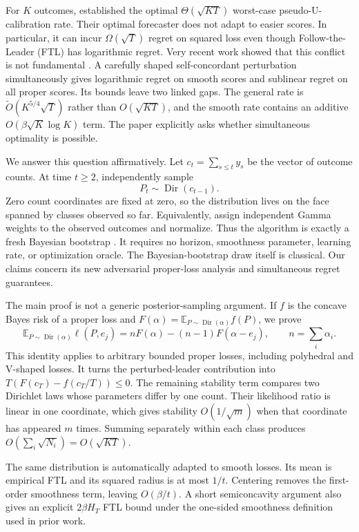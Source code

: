\documentclass{article}
\theoremstyle{definition}
\theoremstyle{remark}
\newcommand{\E}{\mathbb E}
\newcommand{\Dir}{\operatorname{Dir}}
\begin{document}
For $K$ outcomes, \citet{luo2024optimal} established the optimal $\Theta(\sqrt{KT})$ worst-case pseudo-U-calibration rate.  Their optimal forecaster does not adapt to easier scores.  In particular, it can incur $\Omega(\sqrt T)$ regret on squared loss even though Follow-the-Leader (FTL) has logarithmic regret.  Very recent work showed that this conflict is not fundamental \citep{frongillo2026simultaneous}.  A carefully shaped self-concordant perturbation simultaneously gives logarithmic regret on smooth scores and sublinear regret on all proper scores.  Its bounds leave two linked gaps.  The general rate is $\widetilde O(K^{5/4}\sqrt T)$ rather than $O(\sqrt{KT})$, and the smooth rate contains an additive $O(\beta\sqrt K\log K)$ term.  The paper explicitly asks whether simultaneous optimality is possible.

We answer this question affirmatively.  Let $c_t=\sum_{s\leq t}y_s$ be the vector of outcome counts.  At time $t\geq2$, independently sample \[ P_t\sim\Dir(c_{t-1}). \] Zero count coordinates are fixed at zero, so the distribution lives on the face spanned by classes observed so far.  Equivalently, assign independent Gamma weights to the observed outcomes and normalize.  Thus the algorithm is exactly a fresh Bayesian bootstrap \citep{rubin1981bootstrap}.  It requires no horizon, smoothness parameter, learning rate, or optimization oracle. The Bayesian-bootstrap draw itself is classical.  Our claims concern its new adversarial proper-loss analysis and simultaneous regret guarantees.

The main proof is not a generic posterior-sampling argument.  If $f$ is the concave Bayes risk of a proper loss and $F(\alpha)=\E_{P\sim\Dir(\alpha)}f(P)$, we prove
\begin{equation}
 \E_{P\sim\Dir(\alpha)}\ell(P,e_j)
 =nF(\alpha)-(n-1)F(\alpha-e_j),
 \qquad n=\sum_i\alpha_i.                 \tag{1}\label{eq:key-intro}
\end{equation}
This identity applies to arbitrary bounded proper losses, including polyhedral and V-shaped losses.  It turns the perturbed-leader contribution into $T(F(c_T)-f(c_T/T))\leq0$.  The remaining stability term compares two Dirichlet laws whose parameters differ by one count.  Their likelihood ratio is linear in one coordinate, which gives stability $O(1/\sqrt m)$ when that coordinate has appeared $m$ times.  Summing separately within each class produces $O(\sum_i\sqrt{N_i})=O(\sqrt{KT})$.

The same distribution is automatically adapted to smooth losses.  Its mean is empirical FTL and its squared radius is at most $1/t$.  Centering removes the first-order smoothness term, leaving $O(\beta/t)$.  A short semiconcavity argument also gives an explicit $2\beta H_T$ FTL bound under the one-sided smoothness definition used in prior work.
\end{document}
